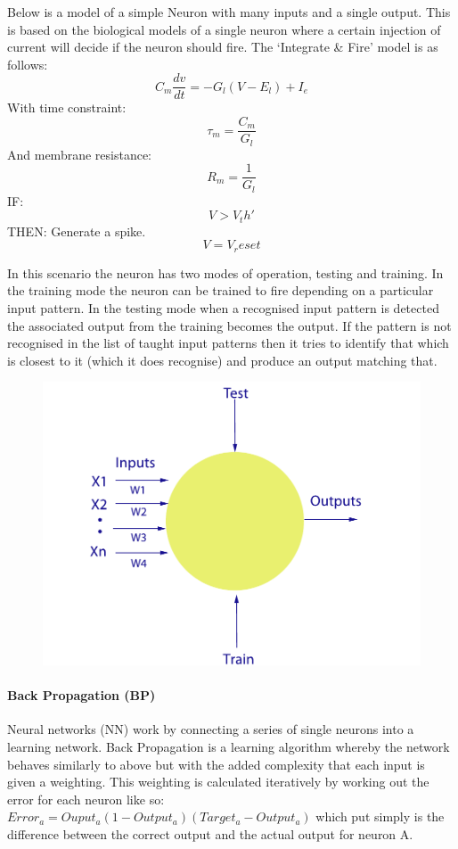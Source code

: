 Below is a model of a simple Neuron with many inputs and a single output. This is based on the biological models of a single neuron where a certain injection of current will decide if the neuron should fire. The `Integrate \& Fire' model is as follows:
$$C_m\frac{dv}{dt}=-G_l(V-E_l)+I_e$$
With time constraint: $$\tau_m = \frac{C_m}{G_l}$$
And membrane resistance: $$R_m = \frac{1}{G_l}$$
IF: $$V > V_th'$$ THEN: Generate a spike. $$V=V_reset$$

In this scenario the neuron has two modes of operation, testing and training. In the training mode the neuron can be trained to fire depending on a particular input pattern. In the testing mode when a recognised input pattern is detected the associated output from the training becomes the output. If the pattern is not recognised in the list of taught input patterns then it tries to identify that which is closest to it (which it does recognise) and produce an output matching that.
\begin{figure}[h]
    \centering
    \includegraphics[height=0.25\textheight]{fig02/nnsimple.pdf}
    \label{fig:kinect}
\end{figure}


\paragraph{Back Propagation (BP)}
Neural networks (NN) work by connecting a series of single neurons into a learning network. Back Propagation is a learning algorithm whereby the network behaves similarly to above but with the added complexity that each input is given a weighting. This weighting is calculated iteratively by working out the error for each neuron like so: $Error_a = Ouput_a(1-Output_a)(Target_a - Output_a)$ which put simply is the difference between the correct output and the actual output for neuron A.

